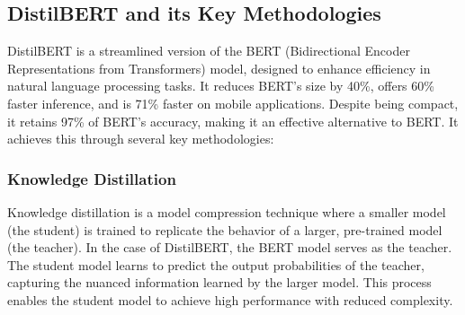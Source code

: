 \subsection{DistilBERT and its Key Methodologies}
DistilBERT is a streamlined version of the BERT (Bidirectional Encoder Representations from Transformers) model, designed to enhance efficiency in natural language processing tasks. It reduces BERT’s size by 40\%, offers 60\% faster inference, and is 71\% faster on mobile applications. Despite being compact, it retains 97\% of BERT’s accuracy, making it an effective alternative to BERT. It achieves this through several key methodologies:
\subsubsection{Knowledge Distillation}
Knowledge distillation is a model compression technique where a smaller model (the student) is trained to replicate the behavior of a larger, pre-trained model (the teacher). In the case of DistilBERT, the BERT model serves as the teacher. The student model learns to predict the output probabilities of the teacher, capturing the nuanced information learned by the larger model. This process enables the student model to achieve high performance with reduced complexity.

